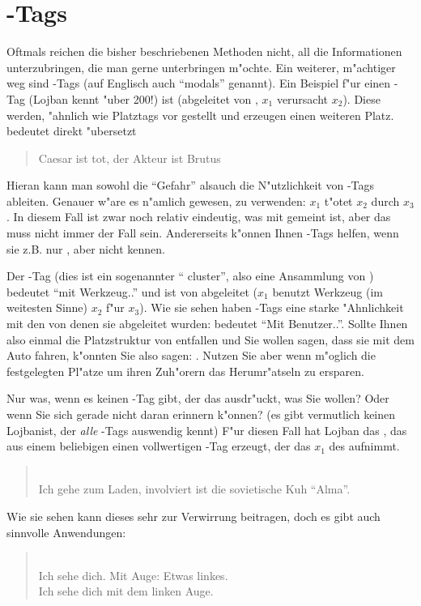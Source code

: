 \section{-Tags}
Oftmals reichen die bisher beschriebenen Methoden nicht, all die Informationen unterzubringen, die man gerne unterbringen m"ochte. Ein weiterer,
m"achtiger weg sind -Tags (auf Englisch auch ``modals'' genannt). Ein Beispiel f"ur einen -Tag (Lojban kennt "uber 200!) ist
 (abgeleitet von , $x_1$ verursacht $x_2$). Diese  werden, "ahnlich wie Platztags vor  gestellt
und erzeugen einen weiteren Platz.  bedeutet direkt "ubersetzt
\begin{quote}
Caesar ist tot, der Akteur ist Brutus
\end{quote}
Hieran kann man sowohl die ``Gefahr'' alsauch die N"utzlichkeit von -Tags ableiten. Genauer w"are es n"amlich gewesen,  zu
verwenden: $x_1$ t"otet $x_2$ durch $x_3$. In diesem Fall ist zwar noch relativ eindeutig, was mit  gemeint ist, aber das muss nicht
immer der Fall sein. Andererseits k"onnen Ihnen -Tags helfen, wenn sie z.B. nur , aber nicht  kennen.

Der -Tag  (dies ist ein sogenannter `` cluster'', also eine Ansammlung von ) bedeutet ``mit Werkzeug..'' und ist von  abgeleitet ($x_1$ benutzt Werkzeug (im weitesten Sinne) $x_2$ f"ur $x_3$). Wie sie sehen haben -Tags
eine starke "Ahnlichkeit mit den  von denen sie abgeleitet wurden:  bedeutet ``Mit Benutzer..''.
Sollte Ihnen also einmal die Platzstruktur von  entfallen und Sie wollen sagen, dass sie mit dem Auto fahren, k"onnten Sie also sagen: .
Nutzen Sie aber wenn m"oglich die festgelegten Pl"atze um ihren Zuh"orern das Herumr"atseln zu ersparen.

Nur was, wenn es keinen -Tag gibt, der das ausdr"uckt, was Sie wollen? Oder wenn Sie sich gerade nicht daran erinnern k"onnen? (es gibt
vermutlich keinen Lojbanist, der \emph{alle} -Tags auswendig kennt)
F"ur diesen Fall hat Lojban das  , das aus einem beliebigen  einen vollwertigen -Tag erzeugt, der das $x_1$ des  aufnimmt.
\begin{quote}
 \\
Ich gehe zum Laden, involviert ist die sovietische Kuh ``Alma''.
\end{quote}
Wie sie sehen kann dieses  sehr zur Verwirrung beitragen, doch es gibt auch sinnvolle Anwendungen:
\begin{quote}
 \\
Ich sehe dich. Mit Auge: Etwas linkes. \\
Ich sehe dich mit dem linken Auge.
\end{quote}

